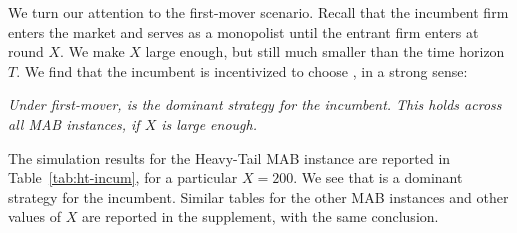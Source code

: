 \documentclass[../competing_bandits_with_appendix.tex]{subfiles}
\begin{document}
We turn our attention to the first-mover scenario. Recall that the incumbent firm enters the market and serves as a monopolist until the entrant firm enters at round $X$. We make $X$ large enough, but still much smaller than the time horizon $T$. We find that the incumbent is incentivized to choose \Thompson, in a strong sense:

\begin{finding}\label{find:temp-monopoly}
\textit{Under first-mover, \Thompson is the dominant strategy for the incumbent. This holds across all MAB instances, if $X$ is large enough.
}
\end{finding}

The simulation results for the Heavy-Tail MAB instance are reported in Table~\ref{tab:ht-incum}, for a particular $X=200$. We see that \Thompson is a dominant strategy for the incumbent. Similar tables for the other MAB instances and other values of $X$ are reported in the supplement, with the same conclusion.
\end{document}

